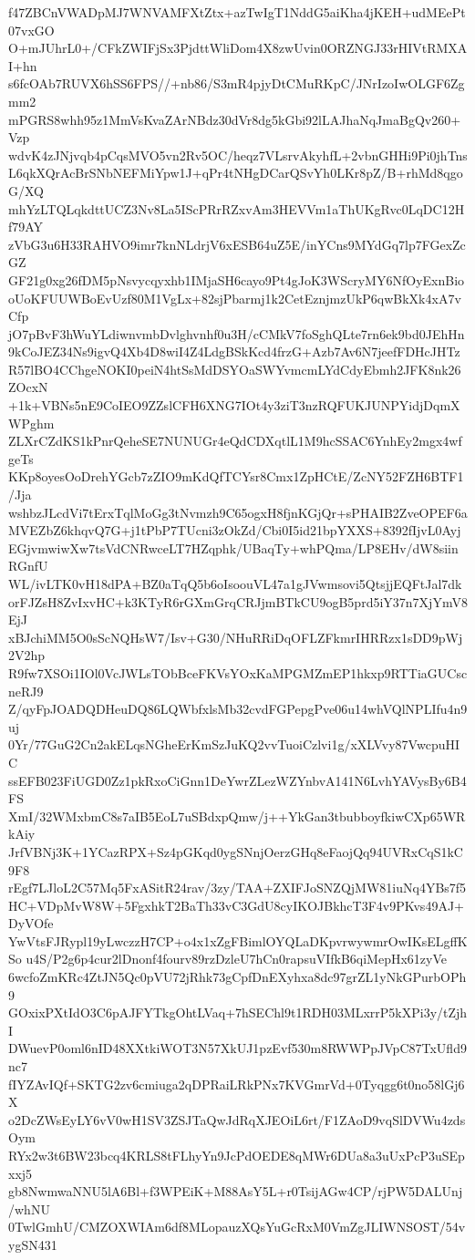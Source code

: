 f47ZBCnVWADpMJ7WNVAMFXtZtx+azTwIgT1NddG5aiKha4jKEH+udMEePt07vxGO
O+mJUhrL0+/CFkZWIFjSx3PjdttWliDom4X8zwUvin0ORZNGJ33rHIVtRMXAI+hn
s6fcOAb7RUVX6hSS6FPS//+nb86/S3mR4pjyDtCMuRKpC/JNrIzoIwOLGF6Zgmm2
mPGRS8whh95z1MmVsKvaZArNBdz30dVr8dg5kGbi92lLAJhaNqJmaBgQv260+Vzp
wdvK4zJNjvqb4pCqsMVO5vn2Rv5OC/heqz7VLsrvAkyhfL+2vbnGHHi9Pi0jhTns
L6qkXQrAcBrSNbNEFMiYpw1J+qPr4tNHgDCarQSvYh0LKr8pZ/B+rhMd8qgoG/XQ
mhYzLTQLqkdttUCZ3Nv8La5IScPRrRZxvAm3HEVVm1aThUKgRvc0LqDC12Hf79AY
zVbG3u6H33RAHVO9imr7knNLdrjV6xESB64uZ5E/inYCns9MYdGq7lp7FGexZcGZ
GF21g0xg26fDM5pNsvycqyxhb1IMjaSH6cayo9Pt4gJoK3WScryMY6NfOyExnBio
oUoKFUUWBoEvUzf80M1VgLx+82sjPbarmj1k2CetEznjmzUkP6qwBkXk4xA7vCfp
jO7pBvF3hWuYLdiwnvmbDvlghvnhf0u3H/cCMkV7foSghQLte7rn6ek9bd0JEhHn
9kCoJEZ34Ns9igvQ4Xb4D8wiI4Z4LdgBSkKcd4frzG+Azb7Av6N7jeefFDHcJHTz
R57lBO4CChgeNOKI0peiN4htSsMdDSYOaSWYvmcmLYdCdyEbmh2JFK8nk26ZOcxN
+1k+VBNs5nE9CoIEO9ZZslCFH6XNG7IOt4y3ziT3nzRQFUKJUNPYidjDqmXWPghm
ZLXrCZdKS1kPnrQeheSE7NUNUGr4eQdCDXqtlL1M9hcSSAC6YnhEy2mgx4wfgeTs
KKp8oyesOoDrehYGcb7zZIO9mKdQfTCYsr8Cmx1ZpHCtE/ZcNY52FZH6BTF1/Jja
wshbzJLcdVi7tErxTqlMoGg3tNvmzh9C65ogxH8fjnKGjQr+sPHAIB2ZveOPEF6a
MVEZbZ6khqvQ7G+j1tPbP7TUcni3zOkZd/Cbi0I5id21bpYXXS+8392fIjvL0Ayj
EGjvmwiwXw7tsVdCNRwceLT7HZqphk/UBaqTy+whPQma/LP8EHv/dW8siinRGnfU
WL/ivLTK0vH18dPA+BZ0aTqQ5b6oIsoouVL47a1gJVwmsovi5QtsjjEQFtJal7dk
orFJZsH8ZvIxvHC+k3KTyR6rGXmGrqCRJjmBTkCU9ogB5prd5iY37n7XjYmV8EjJ
xBJchiMM5O0sScNQHsW7/Isv+G30/NHuRRiDqOFLZFkmrIHRRzx1sDD9pWj2V2hp
R9fw7XSOi1IOl0VcJWLsTObBceFKVsYOxKaMPGMZmEP1hkxp9RTTiaGUCscneRJ9
Z/qyFpJOADQDHeuDQ86LQWbfxlsMb32cvdFGPepgPve06u14whVQlNPLIfu4n9uj
0Yr/77GuG2Cn2akELqsNGheErKmSzJuKQ2vvTuoiCzlvi1g/xXLVvy87VwcpuHIC
ssEFB023FiUGD0Zz1pkRxoCiGnn1DeYwrZLezWZYnbvA141N6LvhYAVysBy6B4FS
XmI/32WMxbmC8s7aIB5EoL7uSBdxpQmw/j++YkGan3tbubboyfkiwCXp65WRkAiy
JrfVBNj3K+1YCazRPX+Sz4pGKqd0ygSNnjOerzGHq8eFaojQq94UVRxCqS1kC9F8
rEgf7LJloL2C57Mq5FxASitR24rav/3zy/TAA+ZXIFJoSNZQjMW81iuNq4YBs7f5
HC+VDpMvW8W+5FgxhkT2BaTh33vC3GdU8cyIKOJBkhcT3F4v9PKvs49AJ+DyVOfe
YwVtsFJRypl19yLwczzH7CP+o4x1xZgFBimlOYQLaDKpvrwywmrOwIKsELgffKSo
u4S/P2g6p4cur2lDnonf4fourv89rzDzleU7hCn0rapsuVIfkB6qiMepHx61zyVe
6wcfoZmKRc4ZtJN5Qc0pVU72jRhk73gCpfDnEXyhxa8dc97grZL1yNkGPurbOPh9
GOxixPXtIdO3C6pAJFYTkgOhtLVaq+7hSEChl9t1RDH03MLxrrP5kXPi3y/tZjhI
DWuevP0oml6nID48XXtkiWOT3N57XkUJ1pzEvf530m8RWWPpJVpC87TxUfld9nc7
fIYZAvIQf+SKTG2zv6cmiuga2qDPRaiLRkPNx7KVGmrVd+0Tyqgg6t0no58lGj6X
o2DcZWsEyLY6vV0wH1SV3ZSJTaQwJdRqXJEOiL6rt/F1ZAoD9vqSlDVWu4zdsOym
RYx2w3t6BW23bcq4KRLS8tFLhyYn9JcPdOEDE8qMWr6DUa8a3uUxPcP3uSEpxxj5
gb8NwmwaNNU5lA6Bl+f3WPEiK+M88AsY5L+r0TsijAGw4CP/rjPW5DALUnj/whNU
0TwlGmhU/CMZOXWIAm6df8MLopauzXQsYuGcRxM0VmZgJLIWNSOST/54vygSN431

